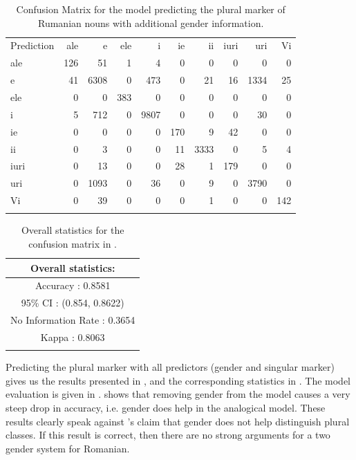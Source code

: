 \begin{table}[!htpb]
  \centering
  \begin{tabular}{lrrrrrrrrr}
    \lsptoprule
    \multicolumn{10}{c}{Reference}                                        \\
    \midrule
    Prediction & ale & e    & ele & i    & ie  & ii   & iuri & uri  & Vi  \\
    ale        & 126 & 51   & 1   & 4    & 0   & 0    & 0    & 0    & 0   \\
    e          & 41  & 6308 & 0   & 473  & 0   & 21   & 16   & 1334 & 25  \\
    ele        & 0   & 0    & 383 & 0    & 0   & 0    & 0    & 0    & 0   \\
    i          & 5   & 712  & 0   & 9807 & 0   & 0    & 0    & 30   & 0   \\
    ie         & 0   & 0    & 0   & 0    & 170 & 9    & 42   & 0    & 0   \\
    ii         & 0   & 3    & 0   & 0    & 11  & 3333 & 0    & 5    & 4   \\
    iuri       & 0   & 13   & 0   & 0    & 28  & 1    & 179  & 0    & 0   \\
    uri        & 0   & 1093 & 0   & 36   & 0   & 9    & 0    & 3790 & 0   \\
    Vi         & 0   & 39   & 0   & 0    & 0   & 1    & 0    & 0    & 142 \\
    \lspbottomrule
  \end{tabular}
  \caption{Confusion Matrix for the model predicting the plural marker of Rumanian nouns with additional gender information.}
  \label{tab:plural-romanian-2}
\end{table}

\begin{table}[!htpb]
  \centering
  \begin{tabular}{c}
    \lsptoprule
    Overall statistics: \\
    \midrule
    Accuracy : 0.8581\\
    95\% CI : (0.854, 0.8622)\\
    No Information Rate : 0.3654\\
    Kappa : 0.8063\\
    \lspbottomrule
  \end{tabular}
  \caption{Overall statistics for the confusion matrix in .}\label{tab:plural-romanian-stats-2}
\end{table}

Predicting the plural marker with all predictors (gender and singular marker) gives us the results presented in , and the corresponding statistics in . The model evaluation is given in .  shows that removing gender from the model causes a very steep drop in accuracy, i.e. gender does help in the analogical model. These results clearly speak against \textcite{Bateman.2010}'s claim that gender does not help distinguish plural classes. If this result is correct, then there are no strong arguments for a two gender system for Romanian.

